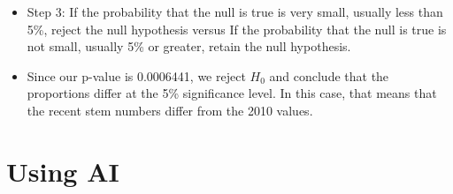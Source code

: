 \documentclass[
  letterpaper,
  DIV=11,
  numbers=noendperiod]{scrreprt}
\newenvironment{Shaded}{\begin{snugshade}}{\end{snugshade}}
\newcommand{\CommentTok}[1]{\textcolor[rgb]{0.37,0.37,0.37}{#1}}
\providecommand{\tightlist}{%
  \setlength{\itemsep}{0pt}\setlength{\parskip}{0pt}}\usepackage{longtable,booktabs,array}
\begin{document}
\begin{Shaded}
\end{Shaded}

\begin{itemize}
\tightlist
\item
  Step 3: If the probability that the null is true is very small,
  usually less than 5\%, reject the null hypothesis versus If the
  probability that the null is true is not small, usually 5\% or
  greater, retain the null hypothesis.
\item
  Since our p-value is 0.0006441, we reject \(H_0\) and conclude that
  the proportions differ at the 5\% significance level. In this case,
  that means that the recent stem numbers differ from the 2010 values.
\end{itemize}


\chapter{Using AI}\label{using-ai-3}
\end{document}
